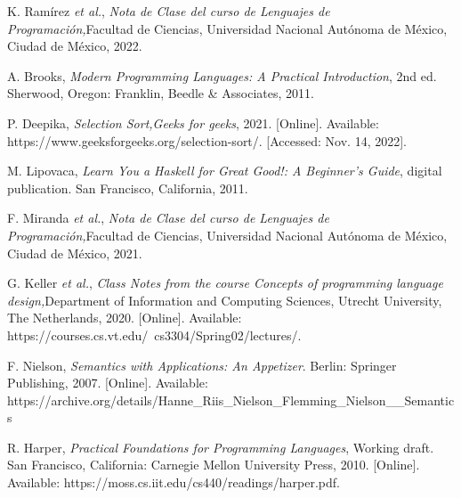 
\begin{thebibliography}{11}


    \label{sec:1}
    \hypertarget{1}{}
    K. Ramírez \textit{et al.}, \textit{Nota de Clase del curso de Lenguajes de Programación,}Facultad de Ciencias, Universidad Nacional Autónoma de México, Ciudad de México, 2022.

    
    \label{sec:2}
    \hypertarget{2}{}
    A. Brooks, \textit{Modern Programming Languages: A Practical Introduction}, 2nd ed. Sherwood, Oregon: Franklin, Beedle \& Associates, 2011.


    \label{sec:3}
    \hypertarget{3}{}
    P. Deepika, \textit{Selection Sort,}\textit{Geeks for geeks}, 2021. [Online]. Available: https://www.geeksforgeeks.org/selection-sort/. [Accessed: Nov. 14, 2022].
 
    \label{sec:4}
    \hypertarget{4}{}
    M. Lipovaca, \textit{Learn You a Haskell for Great Good!: A Beginner's Guide}, digital publication. San Francisco, California, 2011.
    
    \label{sec:5}
    \hypertarget{5}{}
    F. Miranda \textit{et al.}, \textit{Nota de Clase del curso de Lenguajes de Programación,}Facultad de Ciencias, Universidad Nacional Autónoma de México, Ciudad de México, 2021.


    \label{sec:6}
    \hypertarget{6}{}
    G. Keller \textit{et al.}, \textit{Class Notes from the course Concepts of programming language design,}Department of Information and Computing Sciences, Utrecht University, The Netherlands, 2020. [Online]. Available: https://courses.cs.vt.edu/~cs3304/Spring02/lectures/.

    
    \label{swann}
    \label{sec:7}
    \hypertarget{7}{}
    F. Nielson, \textit{Semantics with Applications: An Appetizer}. Berlin: Springer Publishing, 2007. [Online]. Available: https://archive.org/details/Hanne\_Riis\_Nielson\_Flemming\_Nielson\_\_Semantics

    
    \label{sec:8}
    \hypertarget{8}{}
    R. Harper, \textit{Practical Foundations for Programming Languages}, Working draft. San Francisco, California: Carnegie Mellon University Press, 2010. [Online]. Available: https://moss.cs.iit.edu/cs440/readings/harper.pdf.


\end{thebibliography}
